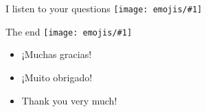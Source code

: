 \documentclass{beamer}
\newcommand{\emoji}[1]{\texttt{[image: emojis/\#1]}}
\begin{document}
\begin{frame}[fragile]{}
    \begin{center}
        \Large 
        I listen to your questions \emoji{cowboy.png}
    \end{center}
\end{frame}
\begin{frame}[fragile]{The end \emoji{angel.png}}
    \begin{itemize}
        \item ¡Muchas gracias!
        \item ¡Muito obrigado!
        \item Thank you very much!
    \end{itemize}
\end{frame}






    
\end{document}
